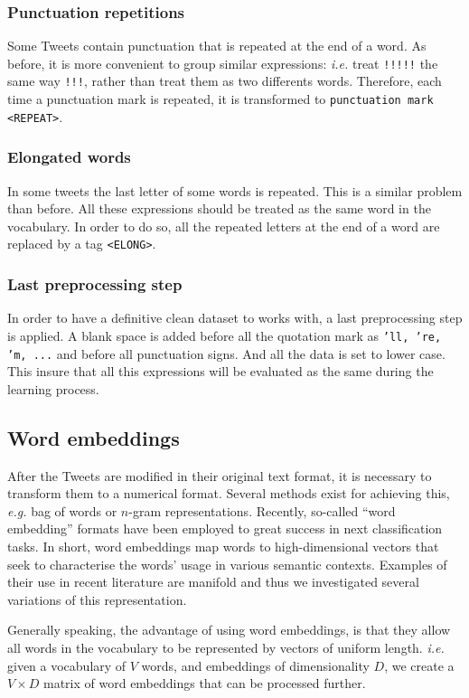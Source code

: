 \subsubsection{Punctuation repetitions}
Some Tweets contain punctuation that is repeated at the end of a word. As before, it is more convenient to group similar expressions: \emph{i.e.} treat \texttt{!!!!!} the same way \texttt{!!!}, rather than treat them as two differents words. Therefore, each time a punctuation mark is repeated, it is transformed to \texttt{punctuation mark <REPEAT>}. 

\subsubsection{Elongated words}
In some tweets the last letter of some words is repeated. This is a similar problem than before. All these expressions should be treated as the same word in the vocabulary. In order to do so, all the repeated letters at the end of a word are replaced by a tag \texttt{<ELONG>}.

\subsubsection{Last preprocessing step}
In order to have a definitive clean dataset to works with, a last preprocessing step is applied. A blank space is added before all the quotation mark as \texttt{'ll, 're, 'm, ...} and before all punctuation signs. And all the data is set to lower case. This insure that all this expressions will be evaluated as the same during the learning process.


\subsection{Word embeddings}
After the Tweets are modified in their original text format, it is necessary to transform them to a numerical format. Several methods exist for achieving this, \emph{e.g.} bag of words or $n$-gram representations. Recently, so-called ``word embedding'' formats \cite{} have been employed to great success in next classification tasks. In short, word embeddings map words to high-dimensional vectors that seek to characterise the words' usage in various semantic contexts. \cite{} Examples of their use in recent literature are manifold \cite{} and thus we investigated several variations of this representation.

Generally speaking, the advantage of using word embeddings, is that they allow all words in the vocabulary to be represented by vectors of uniform length. \emph{i.e.} given a vocabulary of $V$ words, and embeddings of dimensionality $D$, we create a $V \times D$ matrix of word embeddings that can be processed further.

